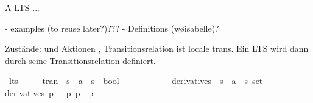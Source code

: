 %
\begin{isabellebody}%
%
%
\isadelimtheory
%
\endisadelimtheory
%
\isatagtheory
%
\endisatagtheory
{\isafoldtheory}%
%
\isadelimtheory
%
\endisadelimtheory
%
\isadelimdocument
%
\endisadelimdocument
%
\isatagdocument
%
\isamarkuptrue%
%
\endisatagdocument
{\isafolddocument}%
%
\isadelimdocument
%
\endisadelimdocument
%
\begin{isamarkuptext}%
A LTS ...

- examples (to reuse later?)???
- Definitions (w\o isabelle)?%
\end{isamarkuptext}\isamarkuptrue%
%
\isadelimdocument
%
\endisadelimdocument
%
\isatagdocument
%
\isamarkuptrue%
%
\endisatagdocument
{\isafolddocument}%
%
\isadelimdocument
%
\endisadelimdocument
%
\begin{isamarkuptext}%
Zustände:  und Aktionen , Transitionsrelation ist locale trans. Ein LTS wird dann durch
seine Transitionsrelation definiert.%
\end{isamarkuptext}\isamarkuptrue%
\isamarkupfalse%
\ lts\ {\isacharequal}{\kern0pt}\ \isanewline
\ \ \ tran\ {\isacharcolon}{\kern0pt}{\isacharcolon}{\kern0pt}\ {\isacartoucheopen}{\isacharprime}{\kern0pt}s\ {\isasymRightarrow}\ {\isacharprime}{\kern0pt}a\ {\isasymRightarrow}\ {\isacharprime}{\kern0pt}s\ {\isasymRightarrow}\ bool{\isacartoucheclose}\isanewline
\ \ \ \ {\isacharparenleft}{\kern0pt}{\isachardoublequoteopen}{\isacharunderscore}{\kern0pt}\ {\isasymmapsto}{\isacharunderscore}{\kern0pt}\ {\isacharunderscore}{\kern0pt}{\isachardoublequoteclose}\ {\isacharbrackleft}{\kern0pt}{}{}{\isacharcomma}{\kern0pt}\ {}{}{\isacharcomma}{\kern0pt}\ {}{}{\isacharbrackright}{\kern0pt}\ {}{}{\isacharparenright}{\kern0pt}\isanewline
{}\isanewline
\isanewline
{}\isamarkupfalse%
\ derivatives\ {\isacharcolon}{\kern0pt}{\isacharcolon}{\kern0pt}\ {\isacartoucheopen}{\isacharprime}{\kern0pt}s\ {\isasymRightarrow}\ {\isacharprime}{\kern0pt}a\ {\isasymRightarrow}\ {\isacharprime}{\kern0pt}s\ set{\isacartoucheclose}\isanewline
\ \ \isanewline
{\isacartoucheopen}derivatives\ p\ {\isasymalpha}\ {\isasymequiv}\ {\isacharbraceleft}{\kern0pt}p{\isacharprime}{\kern0pt}{\isachardot}{\kern0pt}\ p\ {\isasymmapsto}{\isasymalpha}\ p{\isacharprime}{\kern0pt}{\isacharbraceright}{\kern0pt}{\isacartoucheclose}%

\end{isabellebody}
